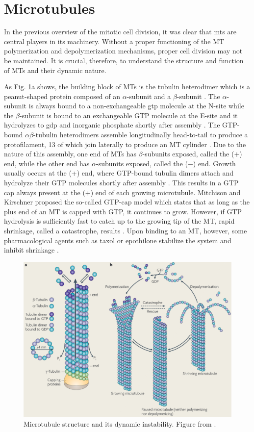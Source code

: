 \documentclass[11pt]{report}
\begin{document}
\section{Microtubules}
\label{MT-Intro}
In the previous overview of the mitotic cell division, it was
clear that \glspl{mt} are central players in its 
machinery. Without a proper functioning of the MT 
polymerization and depolymerization mechanisms, proper cell division
may not be maintained.
It is crucial, therefore, to understand the structure and function
of MTs and their dynamic nature.

As Fig. \ref{f:I-MT}a shows, the building block of MTs is the tubulin heterodimer
which is a peanut-shaped protein composed of an $\alpha$-subunit and a
$\beta$-subunit \cite{Weisenberg1972}. The $\alpha$-subunit is always bound to 
a non-exchangeable \gls{gtp} molecule at the N-site while the $\beta$-subunit
is bound to an exchangeable GTP molecule at the E-site and it hydrolyzes to \gls{gdp} and 
inorganic phosphate shortly after
assembly \cite{Mitchison1993}. 
The GTP-bound $\alpha\beta$-tubulin heterodimers assemble
longitudinally
head-to-tail to produce a protofilament, 13 of which join
laterally to produce an MT cylinder \cite{Dustin1984}. Due to the nature of this
assembly, one end of MTs has $\beta$-subunits exposed, called
the ($+$) end, while the other end has $\alpha$-subunits exposed,
called the ($-$) end. Growth usually occurs at the (+) end,
where GTP-bound tubulin dimers attach and hydrolyze their
GTP molecules shortly after assembly \cite{Walker1988}. 
This results
in a GTP cap always present at the (+) end of each growing 
microtubule. Mitchison and
Kirschner proposed the so-called GTP-cap model which states that as long as the plus end of an MT is capped with GTP, it continues to grow. However,
if GTP hydrolysis is sufficiently fast to catch up to the growing tip of the MT,
rapid shrinkage, called a catastrophe, results \cite{Mitchison1984}. Upon binding to an MT, however,
some pharmacological agents such as taxol or epothilone stabilize the system and inhibit shrinkage \cite{Schiff1980}. 
\begin{figure}
  \centering
  \includegraphics[width=0.9\linewidth]{images/MT.png}
  \caption[Microtubule structure]{Microtubule structure and
  its dynamic instability. Figure from \cite{Conde2009}.}
  \label{f:I-MT}
\end{figure}
\end{document}
